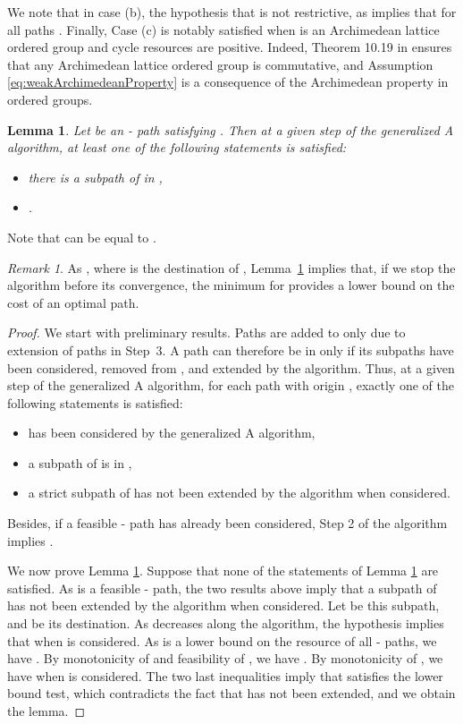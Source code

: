\documentclass[11pt]{amsart}
\theoremstyle{plain}
\newtheorem{lem}[theo]{Lemma}
\theoremstyle{remark}
\newtheorem{rem}{Remark}
\begin{document}
We note that in case (b), the hypothesis that  is not restrictive, as  implies that  for all paths . Finally, Case (c) is notably satisfied when  is an Archimedean lattice ordered group and cycle resources are positive. Indeed, Theorem 10.19 in \cite{blyth2005lattices} ensures that any Archimedean lattice ordered group is commutative, and Assumption \eqref{eq:weakArchimedeanProperty} is a consequence of the Archimedean property in ordered groups.




\begin{lem}\label{lem:upperBoundInGeneralizedAstar}
Let  be an - path satisfying . Then at a given step of the generalized A algorithm, at least one of the following statements is satisfied:
\begin{itemize}
	\item there is a subpath  of  in ,
	\item .
\end{itemize}
\end{lem}
Note that  can be equal to .

\begin{rem}\label{rem:gapLowerBound}
	As , where  is the destination of , Lemma~\ref{lem:upperBoundInGeneralizedAstar} implies that, if we stop the algorithm before its convergence, the minimum  for  provides a lower bound on the cost of an optimal path.
\end{rem}

\begin{proof}
We start with preliminary results. Paths are added to  only due to extension of paths in Step~3. A path  can therefore be in  only if its subpaths have been considered, removed from , and extended by the algorithm. Thus, at a given step of the generalized A algorithm, for each path  with origin , exactly one of the following statements is satisfied:
\begin{itemize}
	\item  has been considered by the generalized A algorithm,
	\item a subpath  of  is in ,
	\item a strict subpath  of  has not been extended by the algorithm when considered. 
\end{itemize}
Besides, if a feasible - path  has already been considered, Step 2 of the algorithm implies .

We now prove Lemma \ref{lem:upperBoundInGeneralizedAstar}. Suppose that none of the statements of Lemma \ref{lem:upperBoundInGeneralizedAstar} are satisfied. As  is a feasible - path, the two results above imply that a subpath  of  has not been extended by the algorithm when considered. Let  be this subpath, and  be its destination. As  decreases along the algorithm, the hypothesis implies that  when  is considered. As  is a lower bound on the resource of all - paths, we have . By monotonicity of  and feasibility of , we have . By monotonicity of , we have  when  is considered. The two last inequalities imply that  satisfies the lower bound test, which contradicts the fact that  has not been extended, and we obtain the lemma.
\end{proof}
\end{document}

